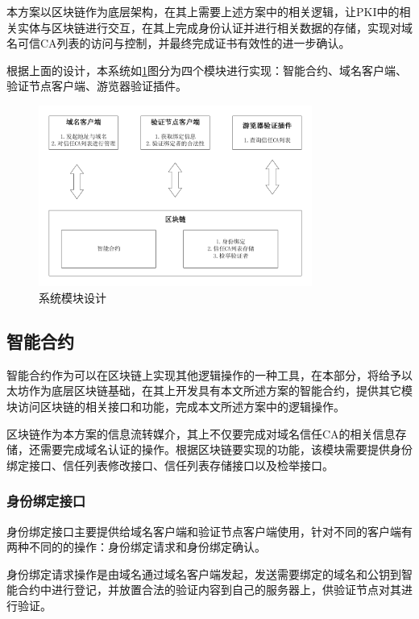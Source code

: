 本方案以区块链作为底层架构，在其上需要上述方案中的相关逻辑，让PKI中的相关实体与区块链进行交互，在其上完成身份认证并进行相关数据的存储，实现对域名可信CA列表的访问与控制，并最终完成证书有效性的进一步确认。

根据上面的设计，本系统如\ref{fig:module}图分为四个模块进行实现：智能合约、域名客户端、验证节点客户端、游览器验证插件。

\begin{figure}[htbp]
 	\centering
 	\includegraphics[width = 0.8\textwidth]{img/module}
 	\caption{系统模块设计}\label{fig:module}
\end{figure}

\subsection{智能合约}

智能合约作为可以在区块链上实现其他逻辑操作的一种工具，在本部分，将给予以太坊作为底层区块链基础，在其上开发具有本文所述方案的智能合约，提供其它模块访问区块链的相关接口和功能，完成本文所述方案中的逻辑操作。

区块链作为本方案的信息流转媒介，其上不仅要完成对域名信任CA的相关信息存储，还需要完成域名认证的操作。根据区块链要实现的功能，该模块需要提供身份绑定接口、信任列表修改接口、信任列表存储接口以及检举接口。

\subsubsection{身份绑定接口}

身份绑定接口主要提供给域名客户端和验证节点客户端使用，针对不同的客户端有两种不同的的操作：身份绑定请求和身份绑定确认。

身份绑定请求操作是由域名通过域名客户端发起，发送需要绑定的域名和公钥到智能合约中进行登记，并放置合法的验证内容到自己的服务器上，供验证节点对其进行验证。

